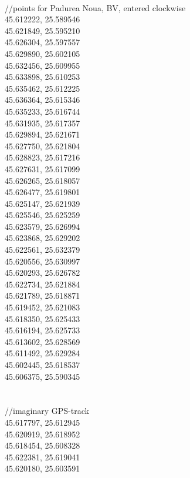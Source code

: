 \documentclass {article}
\begin{document}
\begin{appendices}
\\
//points for Padurea Noua, BV, entered clockwise\\
45.612222, 25.589546\\
45.621849, 25.595210\\
45.626304, 25.597557\\
45.629890, 25.602105\\
45.632456, 25.609955\\
45.633898, 25.610253\\
45.635462, 25.612225\\
45.636364, 25.615346\\
45.635233, 25.616744\\
45.631935, 25.617357\\
45.629894, 25.621671\\
45.627750, 25.621804\\
45.628823, 25.617216\\
45.627631, 25.617099\\
45.626265, 25.618057\\
45.626477, 25.619801\\
45.625147, 25.621939\\
45.625546, 25.625259\\
45.623579, 25.626994\\
45.623868, 25.629202\\
45.622561, 25.632379\\
45.620556, 25.630997\\
45.620293, 25.626782\\
45.622734, 25.621884\\
45.621789, 25.618871\\
45.619452, 25.621083\\
45.618350, 25.625433\\
45.616194, 25.625733\\
45.613602, 25.628569\\
45.611492, 25.629284\\
45.602445, 25.618537\\
45.606375, 25.590345\\
\\
\\
//imaginary GPS-track\\
45.617797, 25.612945\\
45.620919, 25.618952\\
45.618454, 25.608328\\
45.622381, 25.619041\\
45.620180, 25.603591\\

\end{appendices}
\end{document}
